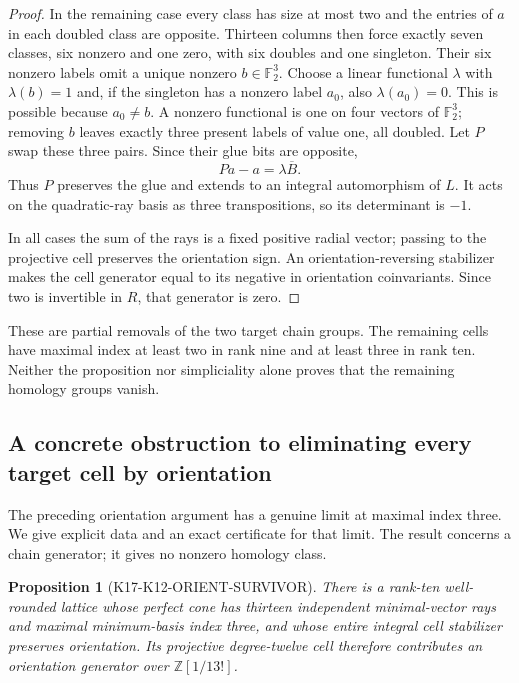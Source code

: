 \documentclass[11pt,a4paper]{article}
\newtheorem{proposition}[theorem]{Proposition}
\theoremstyle{definition}
\begin{document}
\begin{proof}
In the remaining case every class has size at most two and the
entries of $a$ in each doubled class are opposite. Thirteen columns
then force exactly seven classes, six nonzero and one zero, with six
doubles and one singleton. Their six nonzero labels omit a unique
nonzero $b\in\mathbb F_2^3$. Choose a linear functional $\lambda$
with $\lambda(b)=1$ and, if the singleton has a nonzero label $a_0$,
also $\lambda(a_0)=0$. This is possible because $a_0\ne b$.
A nonzero functional is one on four vectors of $\mathbb F_2^3$;
removing $b$ leaves exactly three present labels of value one,
all doubled. Let $P$ swap these three pairs. Since their glue bits
are opposite,
\[
 Pa-a=\lambda\overline B.
\]
Thus $P$ preserves the glue and extends to an integral automorphism
of $L$. It acts on the quadratic-ray basis as three transpositions,
so its determinant is $-1$.

In all cases the sum of the rays is a fixed positive radial vector;
passing to the projective cell preserves the orientation sign.
An orientation-reversing stabilizer makes the cell generator equal
to its negative in orientation coinvariants. Since two is invertible
in $R$, that generator is zero.
\end{proof}

These are partial removals of the two target chain groups. The
remaining cells have maximal index at least two in rank nine and
at least three in rank ten. Neither the proposition nor simpliciality
alone proves that the remaining homology groups vanish.

\subsection{A concrete obstruction to eliminating every target cell by orientation}
\label{subsec:k12-survivor}

The preceding orientation argument has a genuine limit at maximal
index three. We give explicit data and an exact certificate for that
limit. The result concerns a chain generator; it gives no nonzero
homology class.

\begin{proposition}[K17-K12-ORIENT-SURVIVOR]
\label{prop:k12-orientation-survivor}
There is a rank-ten well-rounded lattice whose perfect cone has
thirteen independent minimal-vector rays and maximal minimum-basis
index three, and whose entire integral cell stabilizer preserves
orientation. Its projective degree-twelve cell therefore contributes
an orientation generator over $\mathbb Z[1/13!]$.
\end{proposition}
\end{document}
